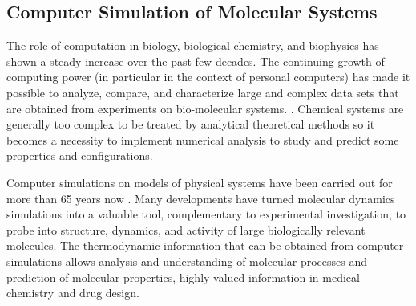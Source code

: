 \subsection{Computer Simulation of Molecular Systems}\label{subsec:computation}

The role of computation in biology, biological chemistry, and biophysics has shown a steady increase over the past few decades. The continuing growth of computing power (in particular in the context of personal computers) has made it possible to analyze, compare, and characterize large and complex data sets that are obtained from experiments on bio-molecular systems. \cite{van2006biomolecular}. Chemical systems are generally too complex to be treated by analytical theoretical methods so it becomes a necessity to implement numerical analysis to study and predict some properties and configurations.

Computer simulations on models of physical systems have been carried out for more than 65 years now \cite{oostenbrink2007applications}. Many developments have turned molecular dynamics simulations into a valuable tool, complementary to experimental investigation, to probe into structure, dynamics, and activity of large biologically relevant molecules. The thermodynamic information that can be obtained from computer simulations allows analysis and understanding of molecular processes and prediction of molecular properties, highly valued information in medical chemistry and drug design. 

